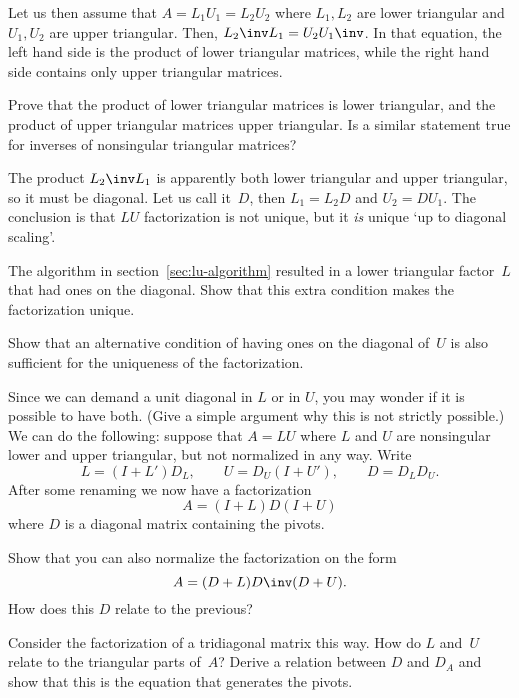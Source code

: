 Let us then assume that $A=L_1U_1=L_2U_2$ where $L_1,L_2$ are lower
triangular and $U_1,U_2$ are upper triangular. Then, $L_2\inv
L_1=U_2U_1\inv$. In that equation, the left hand side is the product
of lower triangular matrices, while the right hand side contains only
upper triangular matrices.

\begin{exercise}
  Prove that the product of lower triangular matrices is lower
  triangular, and the product of upper triangular matrices upper
  triangular. Is a similar statement true for inverses of nonsingular
  triangular matrices?
\end{exercise}

The product $L_2\inv L_1$ is apparently both lower triangular and
upper triangular, so it must be diagonal. Let us call it~$D$, then
$L_1=L_2D$ and $U_2=DU_1$. The conclusion is that $LU$ factorization
is not unique, but it \emph{is} unique `up to diagonal scaling'.

\begin{exercise}
  The algorithm in section~\ref{sec:lu-algorithm} resulted in a lower
  triangular factor~$L$ that had ones on the diagonal. Show that this
  extra condition makes the factorization unique.
\end{exercise}
\begin{exercise}
  Show that an alternative condition of having ones on the diagonal of~$U$
  is also sufficient for the uniqueness of the factorization.
\end{exercise}

Since we can demand a unit diagonal in $L$ or in $U$, you may wonder
if it is possible to have both. (Give a simple argument why this is
not strictly possible.) We can do the following: suppose that $A=LU$
where $L$ and
$U$ are nonsingular lower and upper triangular, but not normalized in any
way. Write \[ L=(I+L')D_L,\qquad U=D_U(I+U'),\qquad D=D_LD_U. \]
After some renaming we now have a factorization
\begin{equation}
  A=(I+L)D(I+U)
  \label{eq:A=LUnormalized}
\end{equation}
where $D$ is a diagonal matrix containing the pivots.

\begin{exercise}
  Show that you can also normalize the factorization on the form
  \[ A=(D+L)D\inv (D+U). \]
  How does this $D$ relate to the previous?
\end{exercise}

\begin{exercise}
  Consider the factorization of a tridiagonal matrix this way. How do
  $L$ and~$U$ relate to the triangular parts of~$A$? Derive a relation
  between $D$ and $D_A$ and show that this is the equation that generates
  the pivots.
\end{exercise}

